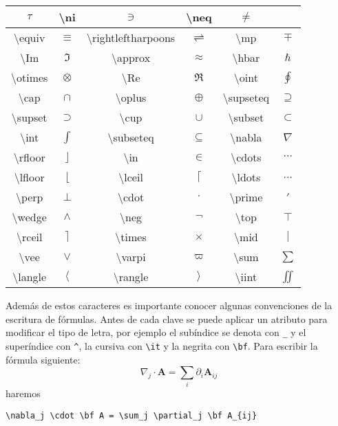 \begin{center}
\begin{tabular}{|c|c|c|c|c|c|}
$\tau$&
\textbackslash{}ni&
$\ni$&
\textbackslash{}neq&
$\neq$\tabularnewline
\hline 
\textbackslash{}equiv&
$\equiv$&
\textbackslash{}rightleftharpoons&
$\rightleftharpoons$&
\textbackslash{}mp&
$\mp$\tabularnewline
\hline 
\textbackslash{}Im&
$\Im$&
\textbackslash{}approx&
$\approx$&
\textbackslash{}hbar&
$\hbar$\tabularnewline
\hline 
\textbackslash{}otimes&
$\otimes$&
\textbackslash{}Re&
$\Re$&
\textbackslash{}oint&
$\oint$\tabularnewline
\hline 
\textbackslash{}cap&
$\cap$&
\textbackslash{}oplus&
$\oplus$&
\textbackslash{}supseteq&
$\supseteq$\tabularnewline
\hline 
\textbackslash{}supset&
$\supset$&
\textbackslash{}cup&
$\cup$&
\textbackslash{}subset&
$\subset$\tabularnewline
\hline 
\textbackslash{}int&
$\int$&
\textbackslash{}subseteq&
$\subseteq$&
\textbackslash{}nabla&
$\nabla$\tabularnewline
\hline 
\textbackslash{}rfloor&
$\rfloor$&
\textbackslash{}in&
$\in$&
\textbackslash{}cdots&
$\cdots$\tabularnewline
\hline 
\textbackslash{}lfloor&
$\lfloor$&
\textbackslash{}lceil&
$\lceil$&
\textbackslash{}ldots&
$\ldots$\tabularnewline
\hline 
\textbackslash{}perp&
$\perp$&
\textbackslash{}cdot&
$\cdot$&
\textbackslash{}prime&
$\prime$\tabularnewline
\hline 
\textbackslash{}wedge&
$\wedge$&
\textbackslash{}neg&
$\neg$&
\textbackslash{}top&
$\top$\tabularnewline
\hline 
\textbackslash{}rceil&
$\rceil$&
\textbackslash{}times&
$\times$&
\textbackslash{}mid&
$\mid$\tabularnewline
\hline 
\textbackslash{}vee&
$\vee$&
\textbackslash{}varpi&
$\varpi$&
\textbackslash{}sum&
$\sum$\tabularnewline
\hline 
\textbackslash{}langle&
$\langle$&
\textbackslash{}rangle&
$\rangle$&
\textbackslash{}iint&
$\iint$\tabularnewline
\hline
\end{tabular}

\end{center}

Además de estos caracteres es importante conocer algunas convenciones
de la escritura de fórmulas. Antes de cada clave se puede aplicar
un atributo para modificar el tipo de letra, por ejemplo el subíndice
se denota con \texttt{\_} y el superíndice con \texttt{\textasciicircum{}},
la cursiva con \texttt{\textbackslash{}it} y la negrita con 
\texttt{\textbackslash{}bf}.
Para escribir la fórmula siguiente:
$$\nabla_{j}\cdot\mathbf{A}=\sum_{i}\partial_{i}\mathbf{A}_{ij}$$
haremos
\begin{verbatim}
\nabla_j \cdot \bf A = \sum_j \partial_j \bf A_{ij}
\end{verbatim}

